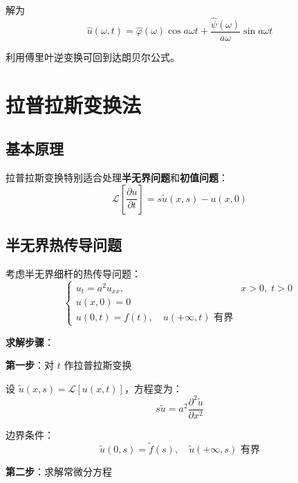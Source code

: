 解为
\begin{equation}
    \hat{u}(\omega, t) = \hat{\varphi}(\omega)\cos a\omega t + \frac{\hat{\psi}(\omega)}{a\omega}\sin a\omega t
\end{equation}

利用傅里叶逆变换可回到达朗贝尔公式。

\section{拉普拉斯变换法}

\subsection{基本原理}

拉普拉斯变换特别适合处理\textbf{半无界问题}和\textbf{初值问题}：
\begin{equation}
    \mathcal{L}\left[\frac{\partial u}{\partial t}\right] = s\tilde{u}(x, s) - u(x, 0)
\end{equation}

\subsection{半无界热传导问题}

考虑半无界细杆的热传导问题：
\begin{equation}
    \begin{cases}
        u_t = a^2u_{xx}, & x > 0, \; t > 0 \\
        u(x, 0) = 0 \\
        u(0, t) = f(t), \quad u(+\infty, t) \text{ 有界}
    \end{cases}
\end{equation}

\textbf{求解步骤}：

\textbf{第一步}：对 $t$ 作拉普拉斯变换

设 $\tilde{u}(x, s) = \mathcal{L}[u(x, t)]$，方程变为：
\begin{equation}
    s\tilde{u} = a^2\frac{\partial^2 \tilde{u}}{\partial x^2}
\end{equation}

边界条件：
\begin{equation}
    \tilde{u}(0, s) = \tilde{f}(s), \quad \tilde{u}(+\infty, s) \text{ 有界}
\end{equation}

\textbf{第二步}：求解常微分方程

